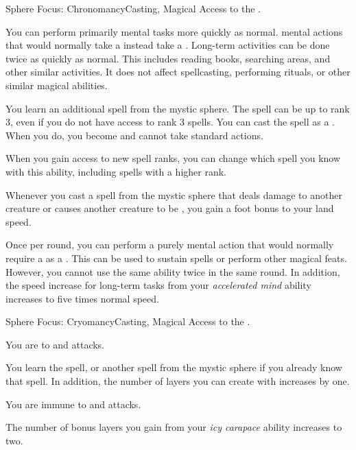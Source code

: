   \begin{magicalfeat}{Sphere Focus: Chronomancy}{Casting, Magical}
    \featpre Access to the  .

     You can perform primarily mental tasks more quickly as normal.
     mental actions that would normally take a  instead take a .
    Long-term activities can be done twice as quickly as normal.
    This includes reading books, searching areas, and other similar activities.
    It does not affect spellcasting, performing rituals, or other similar magical abilities.

     You learn an additional spell from the  mystic sphere.
    The spell can be up to rank 3, even if you do not have access to rank 3 spells.
    You can cast the spell as a .
    When you do, you  become \slowed and cannot take standard actions.

    When you gain access to new spell ranks, you can change which spell you know with this ability, including spells with a higher rank.

     Whenever you cast a spell from the  mystic sphere that deals damage to another creature or causes another creature to be \slowed, you  gain a  foot bonus to your land speed.

     Once per round, you can perform a purely mental action that would normally require a  as a .
    This can be used to sustain spells or perform other magical feats.
    However, you cannot use the same ability twice in the same round.
    In addition, the speed increase for long-term tasks from your \textit{accelerated mind} ability increases to five times normal speed.
  \end{magicalfeat}

  \begin{magicalfeat}{Sphere Focus: Cryomancy}{Casting, Magical}
    \featpre Access to the  .

     You are  to \atCold and \atPoison attacks.

     You learn the  spell, or another spell from the  mystic sphere if you already know that spell.
    In addition, the number of layers you can create with  increases by one.

     You are immune to \atCold and \atPoison attacks.

     The number of bonus layers you gain from your \textit{icy carapace} ability increases to two.
  \end{magicalfeat}

